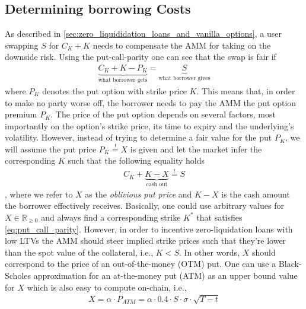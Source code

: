 \documentclass[a4paper]{article}
\begin{document}
\subsection{Determining borrowing Costs}
\label{sec:borrowing_costs}
As described in \cref{sec:zero_liquididation_loans_and_vanilla_options}, a user swapping $S$ for $C_K+K$ needs to compensate the AMM for taking on the downside risk. Using the put-call-parity one can see that the swap is fair if
\begin{equation}
\label{eq:put_call_parity}
\begin{split}
\underbrace{C_K+K-P_K}_{\textrm{what borrower gets}} = \underbrace{S}_{\textrm{what borrower gives}}
\end{split}
\end{equation}
where $P_K$ denotes the put option with strike price $K$. This means that, in order to make no party worse off, the borrower needs to pay the AMM the put option premium $P_K$. The price of the put option depends on several factors, most importantly on the option's strike price, its time to expiry and the underlying's volatility. However, instead of trying to determine a fair value for the put $P_K$, we will assume the put price $P_K\stackrel{!}{=}X$ is given and let the market infer the corresponding $K$ such that the following equality holds
\begin{equation}
\label{eq:put_call_parity}
\begin{split}
C_K+ \underbrace{K-X}_{\textrm{cash out}} \stackrel{!}{=} S
\end{split}
\end{equation}
, where we refer to $X$ as the \emph{oblivious put price} and $K-X$ is the cash amount the borrower effectively receives. Basically, one could use arbitrary values for $X\in \mathbb R_{\ge 0}$ and always find a corresponding strike $K^*$ that satisfies \cref{eq:put_call_parity}. However, in order to incentive zero-liquidation loans with low LTVs the AMM should steer implied strike prices such that they're lower than the spot value of the collateral, i.e., $K<S$. In other words, $X$ should correspond to the price of an out-of-the-money (OTM) put. One can use a Black-Scholes approximation for an at-the-money put (ATM) as an upper bound value for $X$ which is also easy to compute on-chain, i.e.,
\begin{equation}
\begin{split}
\label{eq:oblivious_put_price}
X = \alpha \cdot  P_{ATM} = \alpha \cdot 0.4 \cdot  S \cdot \sigma \cdot \sqrt{T-t}
\end{split}
\end{equation}
\end{document}
